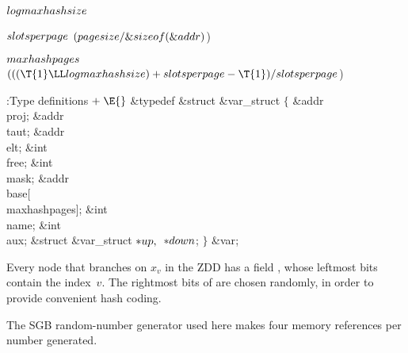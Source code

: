 \Y\B\4\D$\\{logmaxhashsize}$ \5
\par
\B\4\D$\\{slotsperpage}$ \5
$(\\{pagesize}/\&{sizeof}(\&{addr}){}$)\par
\B\4\D$\\{maxhashpages}$ \5
$(((\T{1}\LL\\{logmaxhashsize})+\\{slotsperpage}-\T{1})/\\{slotsperpage}{}$)\par
\Y\B\4:Type definitions\X${}\mathrel+\E{}$\6
\&{typedef} \&{struct} \&{var\_struct} ${}\{{}$\1\6
\&{addr} \\{proj};\6
\&{addr} \\{taut};\6
\&{addr} \\{elt};\6
\&{int} \\{free};\6
\&{int} \\{mask};\6
\&{addr} \\{base}[\\{maxhashpages}];\6
\&{int} \\{name};\6
\&{int} \\{aux};\6
\&{struct} \&{var\_struct} ${}{*}\\{up},{}$ ${}{*}\\{down}{}$;\2\6
${}\}{}$ \&{var};\par
\fi

Every node  that branches on $x_v$ in the ZDD has a
field ,
whose leftmost  bits contain the index~$v$. The rightmost
 bits of  are chosen
randomly, in order to
provide convenient hash coding.

The SGB random-number generator used here makes four memory references
per number generated.

